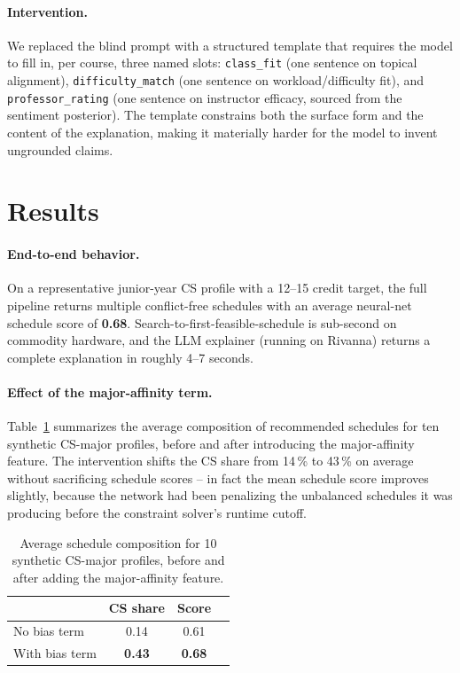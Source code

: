\documentclass[10pt,letterpaper]{article}
\newcommand{\code}[1]{\texttt{\small #1}}
\begin{document}
\paragraph{Intervention.} We replaced the blind prompt with a structured
template that requires the model to fill in, per course, three named slots:
\code{class\_fit} (one sentence on topical alignment),
\code{difficulty\_match} (one sentence on workload/difficulty fit), and
\code{professor\_rating} (one sentence on instructor efficacy, sourced
from the sentiment posterior). The template constrains both the surface
form and the content of the explanation, making it materially harder for
the model to invent ungrounded claims.

\section{Results}

\paragraph{End-to-end behavior.} On a representative junior-year CS profile
with a 12--15 credit target, the full pipeline returns multiple conflict-free 
schedules with an average neural-net schedule score of \textbf{0.68}.
Search-to-first-feasible-schedule is sub-second on commodity hardware, and
the LLM explainer (running on Rivanna) returns a complete explanation in
roughly 4--7 seconds.

\paragraph{Effect of the major-affinity term.} Table~\ref{tab:bias}
summarizes the average composition of recommended schedules for ten
synthetic CS-major profiles, before and after introducing the
major-affinity feature. The intervention shifts the CS share from 14\,\%
to 43\,\% on average without sacrificing schedule scores -- in fact the
mean schedule score improves slightly, because the network had been
penalizing the unbalanced schedules it was producing before the constraint
solver's runtime cutoff.

\begin{table}[t]
  \centering
  \small
  \caption{Average schedule composition for 10 synthetic CS-major
    profiles, before and after adding the major-affinity feature.}
  \label{tab:bias}
  \begin{tabular}{lccc}
    \toprule
    & \textbf{CS share} & \textbf{Score} \\
    \midrule
    No bias term       & 0.14 & 0.61 \\
    With bias term     & \textbf{0.43} & \textbf{0.68} \\
    \bottomrule
  \end{tabular}
\end{table}
\end{document}
